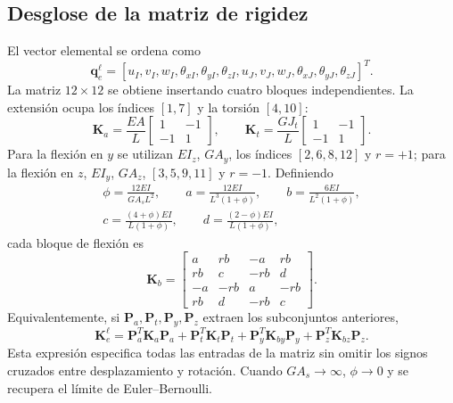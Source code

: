 \documentclass[oneside,a4paper,spanish,links,pagenumbers]{amca}
\begin{document}
\subsection{Desglose de la matriz de rigidez}
El vector elemental se ordena como
\begin{equation}
\bm q_e^\ell=[u_I,v_I,w_I,\theta_{xI},\theta_{yI},\theta_{zI},
u_J,v_J,w_J,\theta_{xJ},\theta_{yJ},\theta_{zJ}]^T.
\end{equation}
La matriz $12\times12$ se obtiene insertando cuatro bloques independientes. La extensión ocupa los índices $[1,7]$ y la torsión $[4,10]$:
\begin{equation}
\bm K_a=\frac{EA}{L}\begin{bmatrix}1&-1\\-1&1\end{bmatrix},
\qquad
\bm K_t=\frac{GJ_t}{L}\begin{bmatrix}1&-1\\-1&1\end{bmatrix}.
\end{equation}
Para la flexión en $y$ se utilizan $EI_z$, $GA_y$, los índices $[2,6,8,12]$ y $r=+1$; para la flexión en $z$, $EI_y$, $GA_z$, $[3,5,9,11]$ y $r=-1$. Definiendo
\begin{equation}
\begin{gathered}
\phi=\frac{12EI}{GA_sL^2},\qquad
a=\frac{12EI}{L^3(1+\phi)},\qquad
b=\frac{6EI}{L^2(1+\phi)},\\
c=\frac{(4+\phi)EI}{L(1+\phi)},\qquad
d=\frac{(2-\phi)EI}{L(1+\phi)},
\end{gathered}
\end{equation}
cada bloque de flexión es
\begin{equation}
\boxed{\bm K_b=
\begin{bmatrix}
a&rb&-a&rb\\rb&c&-rb&d\\-a&-rb&a&-rb\\rb&d&-rb&c
\end{bmatrix}.}
\end{equation}
Equivalentemente, si $\bm P_a,\bm P_t,\bm P_y,\bm P_z$ extraen los subconjuntos anteriores,
\begin{equation}
\bm K_e^\ell=\bm P_a^T\bm K_a\bm P_a+\bm P_t^T\bm K_t\bm P_t
+\bm P_y^T\bm K_{by}\bm P_y+\bm P_z^T\bm K_{bz}\bm P_z.
\end{equation}
Esta expresión especifica todas las entradas de la matriz sin omitir los signos cruzados entre desplazamiento y rotación. Cuando $GA_s\to\infty$, $\phi\to0$ y se recupera el límite de Euler--Bernoulli.
\end{document}
